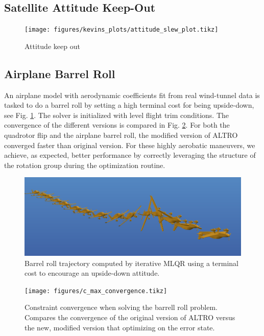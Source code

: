 \documentclass[letterpaper, 10 pt, conference]{ieeeconf}  %
\begin{document}
    \subsection{Satellite Attitude Keep-Out}
        \begin{figure}
            \centering
            \texttt{[image: figures/kevins\_plots/attitude\_slew\_plot.tikz]}
            \caption{Attitude keep out}
        \end{figure}


    \subsection{Airplane Barrel Roll}

        An airplane model with aerodynamic coefficients fit from real wind-tunnel data is
        tasked to do a barrel roll by setting a high terminal cost for being upside-down,
        see Fig. \ref{fig:barrellroll}. The solver is initialized with level flight trim
        conditions. The convergence of the different versions is compared in Fig.
        \ref{fig:c_max_convergence}. For both the quadrotor flip and the airplane barrel
        roll, the modified version of ALTRO converged faster than original version.
        For these highly aerobatic maneuvers, we achieve, as expected, better
        performance by correctly leveraging the structure of the rotation group during
        the optimization routine.
        
        \begin{figure}[h]
            \centering
            \includegraphics[width=\columnwidth]{figures/barrellroll.png}
            \caption{Barrel roll trajectory computed by iterative MLQR using a terminal cost to encourage an upside-down attitude.}
            \label{fig:barrellroll}
        \end{figure}

        \begin{figure}[h]
            \centering
            \texttt{[image: figures/c\_max\_convergence.tikz]}
            \caption{Constraint convergence when solving the barrell roll problem. Compares 
            the convergence of the original version of ALTRO versus the new, modified version
            that optimizing on the error state.}
            \label{fig:c_max_convergence}
        \end{figure}
\end{document}
